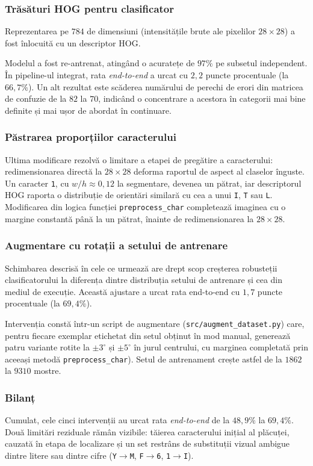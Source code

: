 \subsubsection{Trăsături HOG pentru clasificator}
\indent\par
Reprezentarea pe $784$ de dimensiuni (intensitățile brute ale pixelilor $28\times28$) a fost înlocuită cu un descriptor HOG.

Modelul a fost re-antrenat, atingând o acuratețe de $97\%$ pe subsetul independent. În pipeline-ul integrat, rata \textit{end-to-end} a urcat cu $2{,}2$ puncte procentuale (la $66{,}7\%$). Un alt rezultat este scăderea numărului de perechi de erori din matricea de confuzie de la $82$ la $70$, indicând o concentrare a acestora în categorii mai bine definite și mai ușor de abordat în continuare.

\subsubsection{Păstrarea proporțiilor caracterului}
\indent\par
Ultima modificare rezolvă o limitare a etapei de pregătire a caracterului: redimensionarea directă la $28\times28$ deforma raportul de aspect al claselor înguste. Un caracter \texttt{1}, cu $w/h \approx0{,}12$ la segmentare, devenea un pătrat, iar descriptorul HOG raporta o distribuție de orientări similară cu cea a unui \texttt{I}, \texttt{T} sau \texttt{L}. Modificarea din logica funcției \texttt{preprocess\_char} completează imaginea cu o margine constantă până la un pătrat, înainte de redimensionarea la $28\times28$.


\subsubsection{Augmentare cu rotații a setului de antrenare}
\indent\par
Schimbarea descrisă în cele ce urmează are drept scop creșterea robusteții clasificatorului la diferența dintre distribuția setului de antrenare și cea din mediul de execuție. Această ajustare a urcat rata end-to-end cu $1{,}7$ puncte procentuale (la $69{,}4\%$).

Intervenția constă într-un script de augmentare (\texttt{src/augment\_dataset.py}) care, pentru fiecare exemplar etichetat din setul obținut în mod manual, generează patru variante rotite la $\pm 3^\circ$ și $\pm 5^\circ$ în jurul centrului, cu marginea completată prin aceeași metodă \texttt{preprocess\_char}). Setul de antrenament crește astfel de la $1862$ la $9310$ mostre.

\subsubsection{Bilanț}
\indent\par
Cumulat, cele cinci intervenții au urcat rata \textit{end-to-end} de la $48{,}9\%$ la $69{,}4\%$. Două limitări reziduale rămân vizibile: tăierea caracterului inițial al plăcuței, cauzată în etapa de localizare și un set restrâns de substituții vizual ambigue dintre litere sau dintre cifre (\texttt{Y}$\to$\texttt{M}, \texttt{F}$\to$\texttt{6}, \texttt{1}$\to$\texttt{I}).
